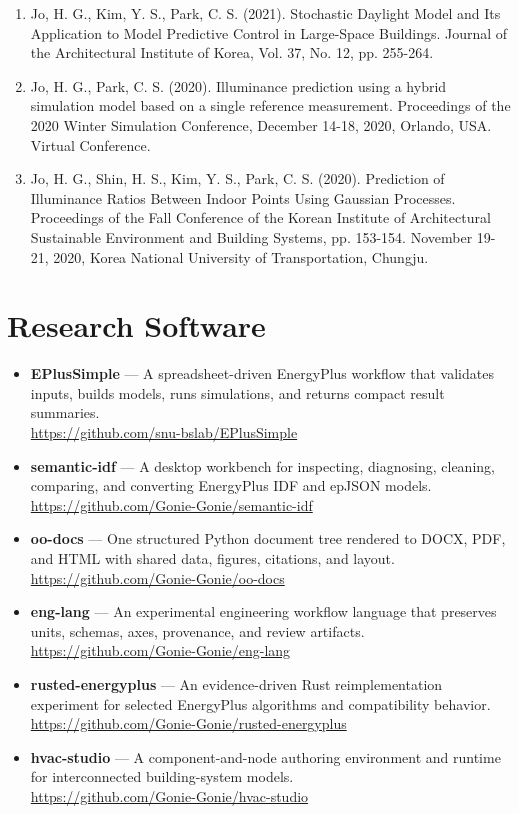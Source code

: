\documentclass[10pt,a4paper]{article}
\begin{document}
\begin{enumerate}[leftmargin=*]
\item Jo, H. G., Kim, Y. S., Park, C. S. (2021). Stochastic Daylight Model and Its Application to Model Predictive Control in Large-Space Buildings. Journal of the Architectural Institute of Korea, Vol. 37, No. 12, pp. 255-264.
\item Jo, H. G., Park, C. S. (2020). Illuminance prediction using a hybrid simulation model based on a single reference measurement. Proceedings of the 2020 Winter Simulation Conference, December 14-18, 2020, Orlando, USA. Virtual Conference.
\item Jo, H. G., Shin, H. S., Kim, Y. S., Park, C. S. (2020). Prediction of Illuminance Ratios Between Indoor Points Using Gaussian Processes. Proceedings of the Fall Conference of the Korean Institute of Architectural Sustainable Environment and Building Systems, pp. 153-154. November 19-21, 2020, Korea National University of Transportation, Chungju.
\end{enumerate}

\section*{Research Software}
\begin{itemize}[leftmargin=*]
\item \textbf{EPlusSimple} --- A spreadsheet-driven EnergyPlus workflow that validates inputs, builds models, runs simulations, and returns compact result summaries.\\\url{https://github.com/snu-bslab/EPlusSimple}
\item \textbf{semantic-idf} --- A desktop workbench for inspecting, diagnosing, cleaning, comparing, and converting EnergyPlus IDF and epJSON models.\\\url{https://github.com/Gonie-Gonie/semantic-idf}
\item \textbf{oo-docs} --- One structured Python document tree rendered to DOCX, PDF, and HTML with shared data, figures, citations, and layout.\\\url{https://github.com/Gonie-Gonie/oo-docs}
\item \textbf{eng-lang} --- An experimental engineering workflow language that preserves units, schemas, axes, provenance, and review artifacts.\\\url{https://github.com/Gonie-Gonie/eng-lang}
\item \textbf{rusted-energyplus} --- An evidence-driven Rust reimplementation experiment for selected EnergyPlus algorithms and compatibility behavior.\\\url{https://github.com/Gonie-Gonie/rusted-energyplus}
\item \textbf{hvac-studio} --- A component-and-node authoring environment and runtime for interconnected building-system models.\\\url{https://github.com/Gonie-Gonie/hvac-studio}
\end{itemize}
\end{document}
